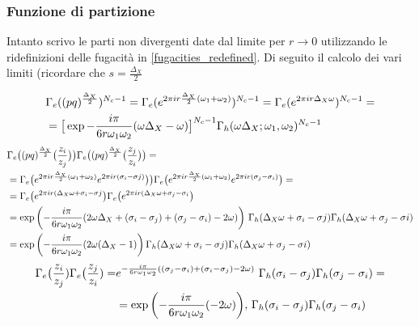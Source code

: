 \documentclass[a4paper,12pt]{article}
\begin{document}
\subsubsection{Funzione di partizione}
Intanto scrivo le parti non divergenti date dal limite per $ r \rightarrow 0$ utilizzando le ridefinizioni delle fugacità in \ref{fugacities_redefined}. Di seguito il calcolo dei vari limiti (ricordare che $ s = \frac{\Delta_X}{2}$


\begin{align*}
& \Gamma_e((pq)^{\frac{\Delta_X}{2}})^{N_c -1} =
\Gamma_e( e^{2 \pi i r  {\Delta_X \over 2} (\omega_1 + \omega_2)})^{N_c-1} =  \Gamma_e( e^{2 \pi i r  \Delta_X \omega })^{N_c-1} = \\
&=\big[ \exp{- \frac{i \pi} {6 r \omega_1 \omega_2 }  ( \omega \Delta_X - \omega) }\big]^{N_c-1} \Gamma_h ( \omega \Delta_X ; \omega_1, \omega_2)^{N_c-1}
\end{align*}
 \begin{align*}
 & \Gamma_e\big( (pq)^{\frac{\Delta_X}{2}} \big( { z_i \over z_j} \big) \big) \Gamma_e \big( (pq)^{\frac{\Delta_X}{2}} \big( { z_j \over z_i} \big) \big) = \\
&= \Gamma_e\big( e^{2 \pi i r \frac{\Delta_X}{2} (\omega_1 + \omega_2)} e^{ 2 \pi  i r (\sigma_i - \sigma j)} \big) \big) \Gamma_e \big( e^{ 2 \pi i r \frac{\Delta_X}{2} (\omega_1 + \omega_2)}  e^{ 2 \pi i r (\sigma_j - \sigma_i)} \big) =  \\
&= \Gamma_e\big( e^{2 \pi  i r (\Delta_X \omega +\sigma_i - \sigma j} \big) \Gamma_e \big(  e^{2 \pi  i r (\Delta_X \omega +\sigma_j - \sigma_i} \big) \\
 & = \exp \bigg( {- \frac{i \pi} {6 r \omega_1 \omega_2 }  ( 2 \omega \Delta_X + (\sigma_i - \sigma_j)+(\sigma_j - \sigma_i) - 2 \omega) }\bigg)\, \, \Gamma_h ( \Delta_X \omega + \sigma_i - \sigma j ) \Gamma_h ( \Delta_X \omega + \sigma_j - \sigma i) \\
 & = \exp\bigg({- \frac{i \pi} {6 r \omega_1 \omega_2 }  ( 2 \omega (\Delta_X - 1) }\bigg)  \, \Gamma_h ( \Delta_X \omega + \sigma_i - \sigma j ) \Gamma_h ( \Delta_X \omega + \sigma_j - \sigma i) 
\end{align*}
\begin{align*}
  \Gamma_e\big( {z_i \over z_j})\Gamma_e\big( {z_j \over z_i}) = &e^{- \frac{i \pi} {6 r \omega_1 \omega_2 }  ( (\sigma_j - \sigma_i) + (\sigma_i- \sigma_j) - 2 \omega)} \, \, \Gamma_h (  \sigma_i - \sigma_j) \Gamma_h (  \sigma_j - \sigma_i) =\\
& = \exp \bigg( {- \frac{i \pi} {6 r \omega_1 \omega_2 }  ( - 2 \omega)}  \bigg) , \, \Gamma_h (  \sigma_i - \sigma_j) \Gamma_h (  \sigma_j - \sigma_i)
\end{align*}
\end{document}
